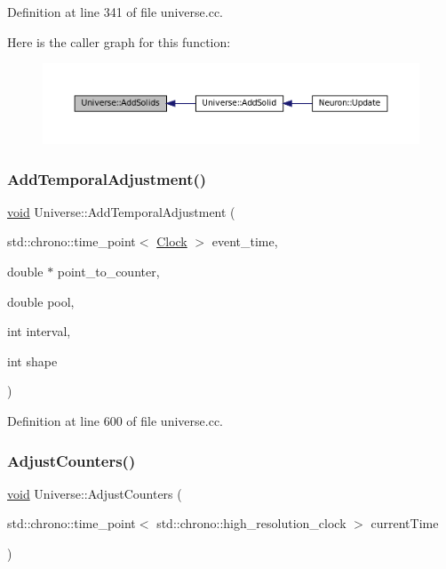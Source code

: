 Definition at line 341 of file universe.\+cc.

Here is the caller graph for this function\+:\nopagebreak
\begin{figure}[H]
\begin{center}
\leavevmode
\includegraphics[width=350pt]{class_universe_a410d5ba2224fe90584b1f1aa5b38b41c_icgraph}
\end{center}
\end{figure}
\mbox{\label{class_universe_a901e16db5e8af258c66af7ac75662fe0}} 
\subsubsection{\texorpdfstring{Add\+Temporal\+Adjustment()}{AddTemporalAdjustment()}}
{\footnotesize\ttfamily \mbox{\hyperlink{glad_8h_a950fc91edb4504f62f1c577bf4727c29}{void}} Universe\+::\+Add\+Temporal\+Adjustment (\begin{DoxyParamCaption}\item[{std\+::chrono\+::time\+\_\+point$<$ \mbox{\hyperlink{universe_8h_a0ef8d951d1ca5ab3cfaf7ab4c7a6fd80}{Clock}} $>$}]{event\+\_\+time,  }\item[{double $\ast$}]{point\+\_\+to\+\_\+counter,  }\item[{double}]{pool,  }\item[{int}]{interval,  }\item[{int}]{shape }\end{DoxyParamCaption})\hspace{0.3cm}{\ttfamily [virtual]}}



Definition at line 600 of file universe.\+cc.

\mbox{\label{class_universe_a15aa20218286fd11ecb9b792dfb63be3}} 
\subsubsection{\texorpdfstring{Adjust\+Counters()}{AdjustCounters()}}
{\footnotesize\ttfamily \mbox{\hyperlink{glad_8h_a950fc91edb4504f62f1c577bf4727c29}{void}} Universe\+::\+Adjust\+Counters (\begin{DoxyParamCaption}\item[{std\+::chrono\+::time\+\_\+point$<$ std\+::chrono\+::high\+\_\+resolution\+\_\+clock $>$}]{current\+Time }\end{DoxyParamCaption})\hspace{0.3cm}{\ttfamily [virtual]}}



